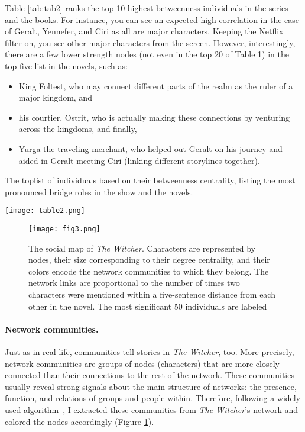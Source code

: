 \documentclass[fleqn,12pt]{wlscirep}
\begin{document}
Table \ref{tab:tab2} ranks the top 10 highest betweenness individuals in the series and the books. For instance, you can see an expected high correlation in the case of Geralt, Yennefer, and Ciri as all are major characters. Keeping the Netflix filter on, you see other major characters from the screen. However, interestingly, there are a few lower strength nodes (not even in the top 20 of Table 1) in the top five list in the novels, such as: 

\begin{itemize}
    \item King Foltest, who may connect different parts of the realm as the ruler of a major kingdom, and 
    \item  his courtier, Ostrit, who is actually making these connections by venturing across the kingdoms, and finally, 
    \item  Yurga the traveling merchant, who helped out Geralt on his journey and aided in Geralt meeting Ciri (linking different storylines together).
\end{itemize}

\begin{table}[!hbt]
\centering
  \caption{The toplist of individuals based on their betweenness centrality, listing the most pronounced bridge roles in the show and the novels.}
  \label{tbl:excel-table}
  \texttt{[image: table2.png]}
  \label{tab:tab2}
\end{table}




\begin{figure}[!hbt]
\centering
\texttt{[image: fig3.png]}
\caption{The social map of {\it The Witcher}. Characters are represented by nodes, their size corresponding to their degree centrality, and their colors encode the network communities to which they belong. The network links are proportional to the number of times two characters were mentioned within a five-sentence distance from each other in the novel. The most significant 50 individuals are labeled}
\label{fig:fig3}
\end{figure}




\paragraph{Network communities.} 

Just as in real life, communities tell stories in {\it The Witcher}, too. More precisely, network communities are groups of nodes (characters) that are more closely connected than their connections to the rest of the network. These communities usually reveal strong signals about the main structure of networks: the presence, function, and relations of groups and people within. Therefore, following a widely used algorithm~\cite{comm}, I extracted these communities from {\it The Witcher}’s network and colored the nodes accordingly (Figure \ref{fig:fig3}).
\end{document}

